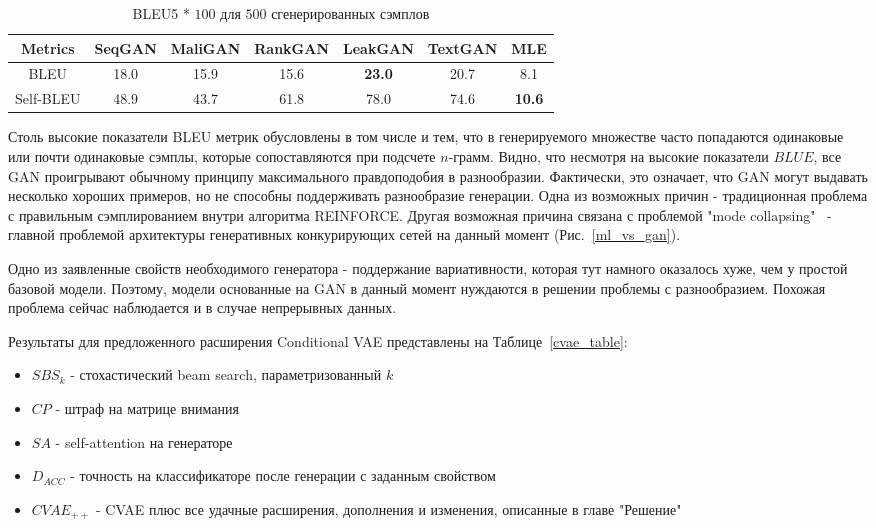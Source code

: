 \documentclass{spbau-diploma}
\begin{document}
\begin{table}[H]
\begin{tabular}{c | c c c c c c}
\toprule
Metrics & SeqGAN & MaliGAN & RankGAN & LeakGAN & TextGAN & MLE \\
\midrule
BLEU & 18.0 & 15.9 & 15.6 & \textbf{23.0} & 20.7 & 8.1 \\
Self-BLEU & 48.9 & 43.7 & 61.8 & 78.0 & 74.6 & \textbf{10.6} \\
\bottomrule
\end{tabular}
\caption{BLEU5 * $100$ для $500$ сгенерированных сэмплов}
\label{ganmle_table}
\end{table}

Столь высокие показатели BLEU метрик обусловлены в том числе и тем, что в 
генерируемого множестве часто попадаются одинаковые или почти одинаковые сэмплы, 
которые сопоставляются при подсчете $n$-грамм.
Видно, что несмотря на высокие показатели $BLUE$, все GAN проигрывают 
обычному принципу максимального правдоподобия в разнообразии. Фактически, это
означает, что GAN могут выдавать несколько хороших примеров, но не способны
поддерживать разнообразие генерации. Одна из возможных причин - традиционная 
проблема с правильным сэмплированием внутри алгоритма REINFORCE. Другая 
возможная причина связана с проблемой "mode collapsing"~\cite{mode_collapsing} 
- главной проблемой архитектуры генеративных конкурирующих сетей на данный 
момент (Рис.~\ref{ml_vs_gan}). 

Одно из заявленные свойств необходимого генератора - поддержание вариативности, 
которая тут намного оказалось хуже, чем у простой базовой модели. Поэтому, 
модели основанные на GAN в данный момент нуждаются в решении проблемы с 
разнообразием. Похожая проблема сейчас наблюдается и в случае непрерывных 
данных.

Результаты для предложенного расширения Conditional VAE представлены на 
Таблице~\ref{cvae_table}: 
\begin{itemize}
    \item $SBS_k$ - стохастический beam search, параметризованный $k$
    \item $CP$ - штраф на матрице внимания
    \item $SA$ - self-attention на генераторе
    \item $D_{ACC}$ - точность на классификаторе после генерации с заданным свойством
    \item $CVAE_{++}$ - CVAE плюс все удачные расширения, дополнения и изменения, описанные в главе "Решение"
\end{itemize}
\end{document}
